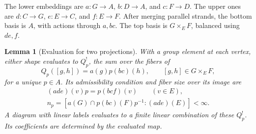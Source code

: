 \documentclass[11pt,a4paper]{article}
\numberwithin{equation}{section}
\newtheorem{lemma}[theorem]{Lemma}
\theoremstyle{definition}
\newcommand{\mixedThreeWires}[3]{%
  \draw[#1] (0,0)--(0,.26)
    .. controls (0,.73) and (1.4,.91) .. (1.4,1.45)
    --(1.4,1.79)
    .. controls (1.4,2.33) and (2.8,2.47) .. (2.8,3.01)
    --(2.8,4.8);
  \draw[#2] (1.4,0)--(1.4,.26)
    .. controls (1.4,.73) and (0,.91) .. (0,1.45)
    --(0,3.35)
    .. controls (0,3.89) and (1.4,4.03) .. (1.4,4.57)
    --(1.4,4.8);
  \draw[#3] (2.8,0)--(2.8,1.79)
    .. controls (2.8,2.33) and (1.4,2.47) .. (1.4,3.01)
    --(1.4,3.35)
    .. controls (1.4,3.89) and (0,4.03) .. (0,4.57)
    --(0,4.8);
}
\newcommand{\mixedThreeLeft}{%
  \foreach \x/\y/\i/\offset in {.7/.82875/1/-.43,2.1/2.4/2/.43,.7/3.96/3/-.43}{
    \fill (\x,\y) circle (1.9pt);
    \node[strandlabel] at ({\x+\offset},\y) {$x_{\i}$};
  }
  \node[region] at (.69,2.4) {$B$};
}
\newcommand{\mixedThreeRight}{%
  \foreach \x/\y/\i/\offset in {2.1/.82875/1/.43,.7/2.4/2/-.43,2.1/3.96/3/.43}{
    \fill (\x,\y) circle (1.9pt);
    \node[strandlabel] at ({\x+\offset},\y) {$y_{\i}$};
  }
  \node[region] at (2.11,2.4) {$B'$};
}
\newcommand{\mixedThreeBoundary}[7]{%
  \node[region] at (-.48,2.4) {$G$};
  \node[region] at (3.28,2.4) {$F$};
  \node[region] at (.70,.18) {$#1$};
  \node[region] at (2.10,.18) {$#2$};
  \node[region] at (.70,4.60) {$#3$};
  \node[region] at (2.10,4.60) {$#4$};
  \foreach \x/\lab in {#5} {\node[strandlabel] at (\x,-.35) {$\bar\lab$};}
  \foreach \x/\lab in {#6} {\node[strandlabel] at (\x,5.15) {$\bar\lab$};}
  \node[font=\normalsize] at (1.4,-.90) {Case #7};
}
\begin{document}
\begin{center}
\end{center}

The lower embeddings are \(a:G\to A\), \(b:D\to A\), and \(c:F\to D\).
The upper ones are \(d:C\to G\), \(e:E\to C\), and \(f:E\to F\).
After merging parallel strands, the bottom basis is \(A\), with actions
through \(a,bc\). The top basis is \(G\times_E F\), balanced using \(de,f\).

\begin{lemma}[Evaluation for two projections]\label{lem:three-projections}
With a group element at each vertex, either shape evaluates to
\(Q_p^!\), the sum over the fibers of
\[
 Q_p([g,h])=a(g)p(bc)(h),\qquad [g,h]\in G\times_E F,
\]
for a unique \(p\in A\). Its admissibility condition and fiber size over its image are
\begin{equation}\label{eq:three-projection-index}
 \begin{gathered}
 (ade)(v)p=p(bcf)(v)\qquad(v\in E),\\
 n_p=[a(G)\cap p(bc)(F)p^{-1}:(ade)(E)]<\infty .
 \end{gathered}
\end{equation}
A diagram with linear labels evaluates to a finite linear combination
of these \(Q_p^!\). Its coefficients are determined by the evaluated map.
\end{lemma}
\end{document}
